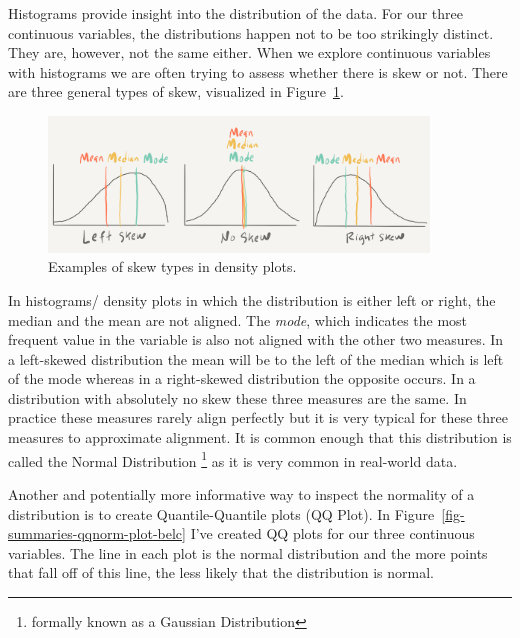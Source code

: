 \documentclass[
  letterpaper,
]{latex/krantz}
\begin{document}
Histograms provide insight into the distribution of the data. For our
three continuous variables, the distributions happen not to be too
strikingly distinct. They are, however, not the same either. When we
explore continuous variables with histograms we are often trying to
assess whether there is skew or not. There are three general types of
skew, visualized in Figure~\ref{fig-summaries-skew-graphic}.

\begin{figure}

{\centering \includegraphics[width=0.9\textwidth,height=\textheight]{./figures/approaching-analysis/skew-types-paper.png}

}

\caption{\label{fig-summaries-skew-graphic}Examples of skew types in
density plots.}

\end{figure}

In histograms/ density plots in which the distribution is either left or
right, the median and the mean are not aligned. The \emph{mode}, which
indicates the most frequent value in the variable is also not aligned
with the other two measures. In a left-skewed distribution the mean will
be to the left of the median which is left of the mode whereas in a
right-skewed distribution the opposite occurs. In a distribution with
absolutely no skew these three measures are the same. In practice these
measures rarely align perfectly but it is very typical for these three
measures to approximate alignment. It is common enough that this
distribution is called the Normal Distribution \footnote{formally known
  as a Gaussian Distribution} as it is very common in real-world data.

Another and potentially more informative way to inspect the normality of
a distribution is to create Quantile-Quantile plots (QQ Plot). In
Figure~\ref{fig-summaries-qqnorm-plot-belc} I've created QQ plots for
our three continuous variables. The line in each plot is the normal
distribution and the more points that fall off of this line, the less
likely that the distribution is normal.
\end{document}
